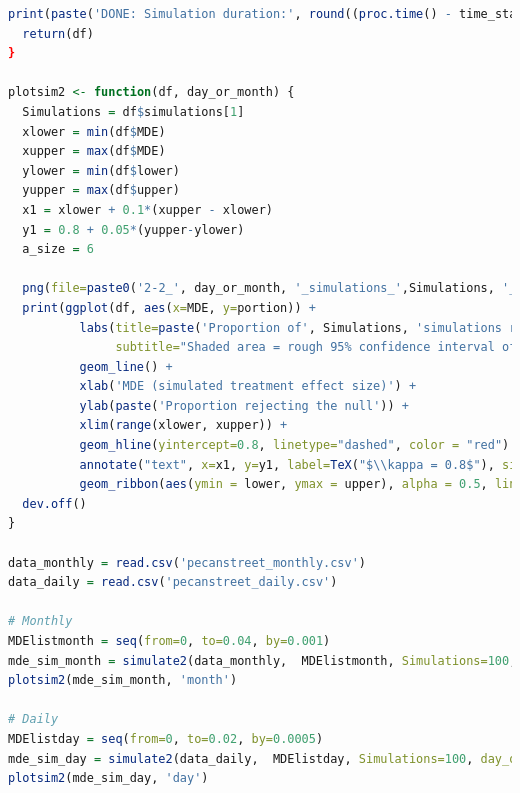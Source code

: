 \documentclass[12pt]{article}
\begin{document}
\begin{lstlisting}[language=R]
  print(paste('DONE: Simulation duration:', round((proc.time() - time_start)[3]/60, 2), 'min'))
  return(df)
}

plotsim2 <- function(df, day_or_month) {
  Simulations = df$simulations[1]
  xlower = min(df$MDE)
  xupper = max(df$MDE)
  ylower = min(df$lower)
  yupper = max(df$upper)
  x1 = xlower + 0.1*(xupper - xlower)
  y1 = 0.8 + 0.05*(yupper-ylower)
  a_size = 6
  
  png(file=paste0('2-2_', day_or_month, '_simulations_',Simulations, '_', xlower, '-to-', xupper, '.png'), width=800, height=400)
  print(ggplot(df, aes(x=MDE, y=portion)) +
          labs(title=paste('Proportion of', Simulations, 'simulations rejecting the null when applying MDE'),
               subtitle="Shaded area = rough 95% confidence interval of portions") +
          geom_line() +
          xlab('MDE (simulated treatment effect size)') +
          ylab(paste('Proportion rejecting the null')) +
          xlim(range(xlower, xupper)) +
          geom_hline(yintercept=0.8, linetype="dashed", color = "red") +
          annotate("text", x=x1, y=y1, label=TeX("$\\kappa = 0.8$"), size=a_size) +
          geom_ribbon(aes(ymin = lower, ymax = upper), alpha = 0.5, linetype="dashed", color="green"))
  dev.off()
}

data_monthly = read.csv('pecanstreet_monthly.csv')
data_daily = read.csv('pecanstreet_daily.csv')

# Monthly
MDElistmonth = seq(from=0, to=0.04, by=0.001)
mde_sim_month = simulate2(data_monthly,  MDElistmonth, Simulations=100, day_or_month='month')
plotsim2(mde_sim_month, 'month')

# Daily
MDElistday = seq(from=0, to=0.02, by=0.0005)
mde_sim_day = simulate2(data_daily,  MDElistday, Simulations=100, day_or_month='day')
plotsim2(mde_sim_day, 'day')
\end{lstlisting}
\end{document}
